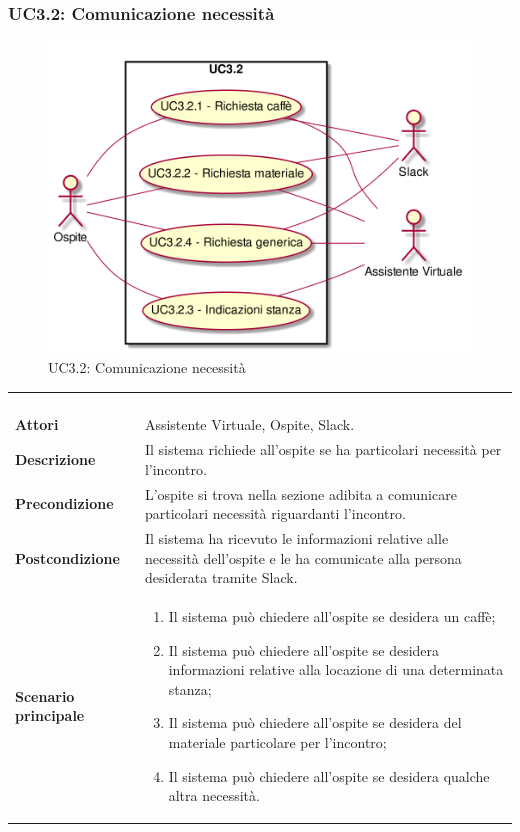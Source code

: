 \newpage\subsubsection{UC3.2: Comunicazione necessità}
\label{UC3.2}
\begin{figure}[h]
	\centering
	\includegraphics[width=\textwidth,height=\textheight,keepaspectratio]{images/UseCaseUC32.png}
	\caption{UC3.2: Comunicazione necessità}
\end{figure}
\begin{longtable}{l|p{10cm}}
	\rowcolor[gray]{0.8} \multicolumn{2}{c}{} \\
	\rowcolor[gray]{0.8} \multicolumn{2}{c}{\textbf{UC3.2 - Comunicazione necessità}} \\
	\rowcolor[gray]{0.8} \multicolumn{2}{c}{} \\
	\hline
	&\\
	\textbf{Attori} & Assistente Virtuale, Ospite, Slack.\\[7pt]
	\textbf{Descrizione} & Il sistema richiede all'ospite se ha particolari necessità per l'incontro.\\[7pt]
	\textbf{Precondizione} & L'ospite si trova nella sezione adibita a comunicare particolari necessità riguardanti l'incontro.\\[7pt]
	\textbf{Postcondizione} & Il sistema ha ricevuto le informazioni relative alle necessità dell'ospite e le ha comunicate alla persona desiderata tramite Slack.\\[7pt]
	\textbf{Scenario principale} &\begin{enumerate}
		\item  Il sistema può chiedere all'ospite se desidera un caffè;
		\item  Il sistema può chiedere all'ospite se desidera informazioni relative alla locazione di una determinata stanza; 
		\item  Il sistema può chiedere all'ospite se desidera del materiale particolare per l'incontro;
		\item  Il sistema può chiedere all'ospite se desidera qualche altra necessità.
	\end{enumerate}
	\\[7pt]\hline
\end{longtable}

